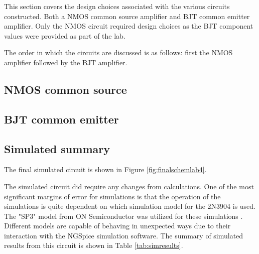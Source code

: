 



This section covers the design choices associated with the various circuits constructed. Both a NMOS common source amplifier and BJT common emitter amplifier. Only the NMOS circuit required design choices as the BJT component values were provided as part of the lab.

The order in which the circuits are discussed is as follows: first the NMOS amplifier followed by the BJT amplifier.


\subsection{NMOS common source}


\subsection{BJT common emitter}




\subsection{Simulated summary}
The final simulated circuit is shown in Figure \ref{fig:finalschemlab4}.


The simulated circuit did require any changes from calculations. One of the most significant margins of error for simulations is that the operation of the simulations is quite dependent on which simulation model for the 2N3904 is used. The "SP3" model from ON Semiconductor was utilized for these simulations \cite{spice}. Different models are capable of behaving in unexpected ways due to their interaction with the NGSpice simulation software. The summary of simulated results from this circuit is shown in Table \ref{tab:simresults}.

